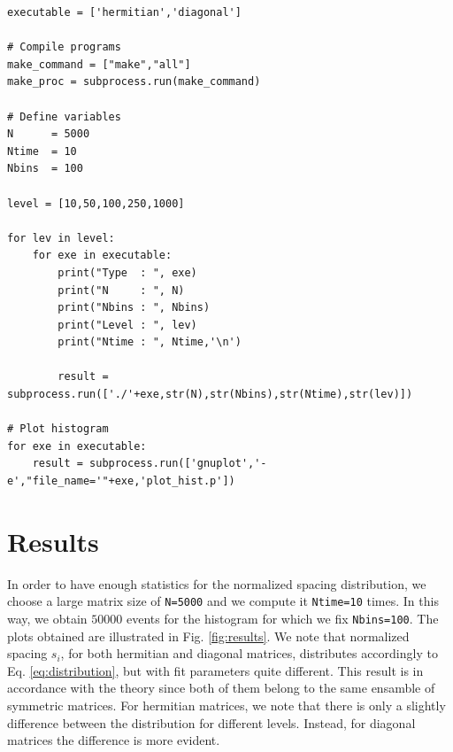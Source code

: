 \documentclass[rmp,10pt,onecolumn,fleqn,notitlepage]{revtex4-1}
\begin{document}
\begin{minipage}[t]{0.85\linewidth}%
\begin{lstlisting}[style=Python]
executable = ['hermitian','diagonal']

# Compile programs
make_command = ["make","all"]
make_proc = subprocess.run(make_command)

# Define variables
N      = 5000
Ntime  = 10
Nbins  = 100

level = [10,50,100,250,1000]

for lev in level:
    for exe in executable:
        print("Type  : ", exe)
        print("N     : ", N)
        print("Nbins : ", Nbins)
        print("Level : ", lev)
        print("Ntime : ", Ntime,'\n')

        result = subprocess.run(['./'+exe,str(N),str(Nbins),str(Ntime),str(lev)])

# Plot histogram
for exe in executable:
    result = subprocess.run(['gnuplot','-e',"file_name='"+exe,'plot_hist.p'])\end{lstlisting}
\end{minipage}

\section{Results}

In order to have enough statistics for the normalized spacing distribution, we choose a large matrix size of \texttt{N=5000} and we compute it \texttt{Ntime=10} times. In this way, we obtain \( 50000 \) events for the histogram for which we fix \texttt{Nbins=100}. The plots obtained are illustrated in Fig. \ref{fig:results}.
We note that normalized spacing \( s_i \), for both hermitian and diagonal matrices, distributes accordingly to Eq. \eqref{eq:distribution}, but with fit parameters quite different.
This result is in accordance with the theory since both of them belong to the same ensamble of symmetric matrices.
For hermitian matrices, we note that there is only a slightly difference between the distribution for different levels. Instead, for diagonal matrices the difference is more evident.
\end{document}
